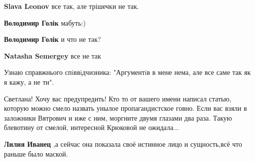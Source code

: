 \begin{itemize}
\begin{itemize}
\textbf{Slava Leonov} все так, але трішечки не так.

 
\textbf{Володимир Голік} мабуть:)

 
\textbf{Володимир Голік} и что не так?

 
\textbf{Natasha Semergey} все не так

 
Узнаю справжнього спiввiдчизника: "Аргументiв в мене нема, але все саме так як я кажу, а не ти".
\end{itemize}

 

Светлана! Хочу вас предупредить! Кто то от вашего имени написал статью, которую
можно смело назвать унылое пропагандистское говно. Если вас взяли в заложники
Вятрович и иже с ним, моргните двумя глазами два раза. Такую блевотину от
смелой, интересной Крюковой не ожидала...

\begin{itemize}
 
\textbf{Лилия Иванец} ,а сейчас она показала своё истинное лицо и сущность,всё что раньше было маской.


\end{itemize}
\end{itemize}

